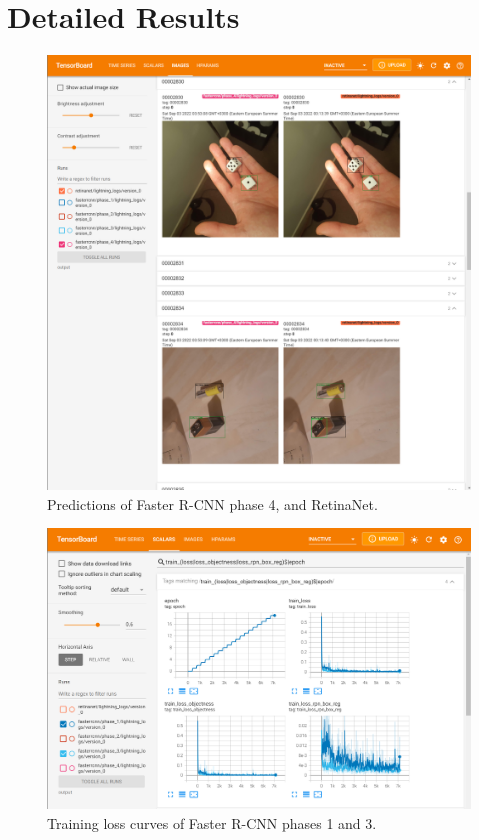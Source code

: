 \documentclass{article}
\begin{document}
\section{Detailed Results}
\label{appendix:results}

\begin{figure}[h]
    \centering
    \includegraphics[width=\textwidth]{tensorboard_screenshots/predictions.png}
    \caption{Predictions of Faster R-CNN phase 4, and RetinaNet.}
    \label{fig:predictions}
\end{figure}

\begin{figure}[h]
    \centering
    \includegraphics[width=\textwidth]{tensorboard_screenshots/train_losses_p13.png}
    \caption{Training loss curves of Faster R-CNN phases 1 and 3.}
    \label{fig:train_losses_p13}
\end{figure}
\end{document}
